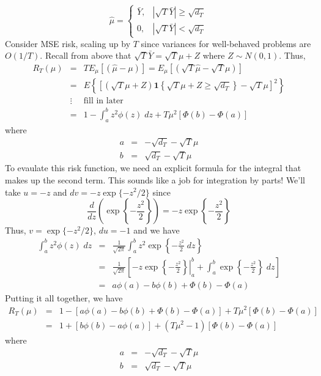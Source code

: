 	$$\widehat{\mu}=\left\{\begin{array}
		{cc} \bar{Y}, & |\sqrt{T}\bar{Y} | \geq \sqrt{d_T} \\
		0, & |\sqrt{T}\bar{Y} | < \sqrt{d_T}
		\end{array}\right.$$
Consider MSE risk, scaling up by $T$ since variances for well-behaved problems are $O(1/T)$. Recall from above that $\sqrt{T} \bar{Y} = \sqrt{T}\mu +Z$ where $Z\sim N(0,1)$. Thus,
\begin{eqnarray*}
	R_T(\mu) &=& T E_\mu\left[\left( \widehat{\mu} - \mu\right)\right] = E_\mu\left[\left(\sqrt{T} \widehat{\mu} - \sqrt{T} \mu\right)\right]\\
		&=& E\left\{\left[ \left(\sqrt{T}\mu + Z \right)\mathbf{1}\left\{\sqrt{T}\mu + Z \geq \sqrt{d_T}\right\}- \sqrt{T}\mu \right]^2 \right\}\\
		&\vdots& \boxed{\mbox{fill in later}}\\
		&=& 1 - \int_{a}^{b} z^2 \phi(z)\; dz + T\mu^2 \left[\Phi(b) - \Phi(a) \right]
\end{eqnarray*}
where
	\begin{eqnarray*}
		a &=& -\sqrt{d_T} - \sqrt{T}\mu\\
		b &=& \sqrt{d_T} - \sqrt{T}\mu
	\end{eqnarray*}
To evaulate this risk function, we need an explicit formula for the integral that makes up the second term. This sounds like a job for integration by parts! We'll take $u = -z$ and $dv = -z \exp\{-z^2/2\}$ since
	$$\frac{d}{dz} \left(\exp\left\{-\frac{z^2}{2}\right\}\right) = -z\exp\left\{-\frac{z^2}{2}\right\}$$
Thus, $v = \exp\{-z^2/2\}$, $du = -1$ and we have
\begin{eqnarray*}
	\int_a^b z^2 \phi(z) \; dz &=&\frac{1}{\sqrt{2\pi}} \int_a^b z^2 \exp\left\{-\frac{z^2}{2} \; dz\right\} \\
		&=& \frac{1}{\sqrt{2\pi}}\left[-z \exp\left\{ \left.-\frac{z^2}{2}\right\}\right|_a^b+ \int_a^b \exp\left\{-\frac{z^2}{2}\right\}  \; dz \right]\\
		&=& a\phi(a) - b\phi(b) + \Phi(b) - \Phi(a)
\end{eqnarray*}
Putting it all together, we have
	\begin{eqnarray*}
		R_T(\mu) &=& 1 - \left[a\phi(a) - b\phi(b) + \Phi(b) - \Phi(a) \right] + T\mu^2 \left[\Phi(b) - \Phi(a) \right]\\
		&=&1 + \left[b\phi(b) - a\phi(a)\right]  + (T\mu^2 - 1) \left[\Phi(b) - \Phi(a) \right] 
	\end{eqnarray*}
where
	\begin{eqnarray*}
		a &=& -\sqrt{d_T} - \sqrt{T}\mu\\
		b &=& \sqrt{d_T} - \sqrt{T}\mu
	\end{eqnarray*}

